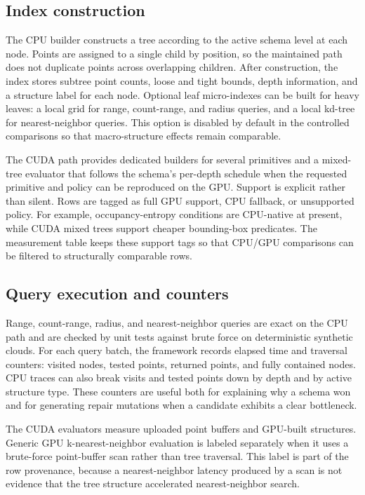\subsection{Index construction}

The CPU builder constructs a tree according to the active schema level at each node. Points are assigned to a single child by position, so the maintained path does not duplicate points across overlapping children. After construction, the index stores subtree point counts, loose and tight bounds, depth information, and a structure label for each node. Optional leaf micro-indexes can be built for heavy leaves: a local grid for range, count-range, and radius queries, and a local kd-tree for nearest-neighbor queries. This option is disabled by default in the controlled comparisons so that macro-structure effects remain comparable.

The CUDA path provides dedicated builders for several primitives and a mixed-tree evaluator that follows the schema's per-depth schedule when the requested primitive and policy can be reproduced on the GPU. Support is explicit rather than silent. Rows are tagged as full GPU support, CPU fallback, or unsupported policy. For example, occupancy-entropy conditions are CPU-native at present, while CUDA mixed trees support cheaper bounding-box predicates. The measurement table keeps these support tags so that CPU/GPU comparisons can be filtered to structurally comparable rows.

\subsection{Query execution and counters}

Range, count-range, radius, and nearest-neighbor queries are exact on the CPU path and are checked by unit tests against brute force on deterministic synthetic clouds. For each query batch, the framework records elapsed time and traversal counters: visited nodes, tested points, returned points, and fully contained nodes. CPU traces can also break visits and tested points down by depth and by active structure type. These counters are useful both for explaining why a schema won and for generating repair mutations when a candidate exhibits a clear bottleneck.

The CUDA evaluators measure uploaded point buffers and GPU-built structures. Generic GPU k-nearest-neighbor evaluation is labeled separately when it uses a brute-force point-buffer scan rather than tree traversal. This label is part of the row provenance, because a nearest-neighbor latency produced by a scan is not evidence that the tree structure accelerated nearest-neighbor search.

